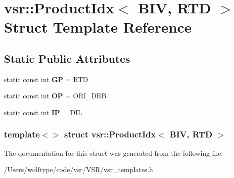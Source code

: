 \hypertarget{structvsr_1_1_product_idx_3_01_b_i_v_00_01_r_t_d_01_4}{\section{vsr\-:\-:Product\-Idx$<$ B\-I\-V, R\-T\-D $>$ Struct Template Reference}
\label{structvsr_1_1_product_idx_3_01_b_i_v_00_01_r_t_d_01_4}
}
\subsection*{Static Public Attributes}
\begin{DoxyCompactItemize}
\item 
\hypertarget{structvsr_1_1_product_idx_3_01_b_i_v_00_01_r_t_d_01_4_a76c365ddf439e19c1dd5bfe278eba4e5}{static const int {\bfseries G\-P} = R\-T\-D}\label{structvsr_1_1_product_idx_3_01_b_i_v_00_01_r_t_d_01_4_a76c365ddf439e19c1dd5bfe278eba4e5}

\item 
\hypertarget{structvsr_1_1_product_idx_3_01_b_i_v_00_01_r_t_d_01_4_acc0ef81bf746a182f30e3cf909a43fff}{static const int {\bfseries O\-P} = O\-R\-I\-\_\-\-D\-R\-B}\label{structvsr_1_1_product_idx_3_01_b_i_v_00_01_r_t_d_01_4_acc0ef81bf746a182f30e3cf909a43fff}

\item 
\hypertarget{structvsr_1_1_product_idx_3_01_b_i_v_00_01_r_t_d_01_4_ac6f1e92a4985d3304ec18e5c2ebed9e3}{static const int {\bfseries I\-P} = D\-I\-L}\label{structvsr_1_1_product_idx_3_01_b_i_v_00_01_r_t_d_01_4_ac6f1e92a4985d3304ec18e5c2ebed9e3}

\end{DoxyCompactItemize}
\subsubsection*{template$<$$>$ struct vsr\-::\-Product\-Idx$<$ B\-I\-V, R\-T\-D $>$}



The documentation for this struct was generated from the following file\-:\begin{DoxyCompactItemize}
\item 
/\-Users/wolftype/code/vsr/\-V\-S\-R/vsr\-\_\-templates.\-h\end{DoxyCompactItemize}
